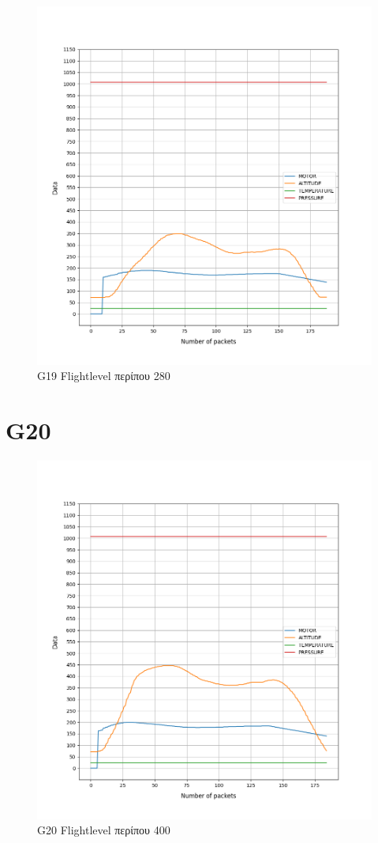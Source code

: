 \documentclass[hidelinks, 12pt, a4paper]{article}
\begin{document}
\begin{figure}[h!]
\centering
	\includegraphics[height=.4\textheight, width=\textwidth]{assets/session2/g19.png}
    \caption{G19 Flightlevel περίπου 280}
\end{figure}

\section{G20}

\begin{figure}[h!]
\centering
	\includegraphics[height=.4\textheight, width=\textwidth]{assets/session2/g20.png}
    \caption{G20 Flightlevel περίπου 400}
\end{figure}
\end{document}
